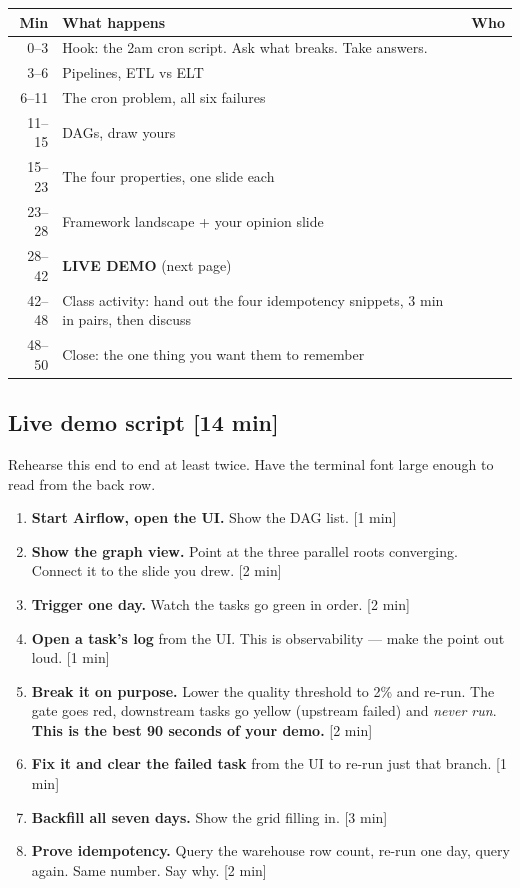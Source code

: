 \documentclass[11pt]{article}
\newcommand{\key}[1]{\textcolor{accent}{\textbf{#1}}}
\newcommand{\tm}[1]{\textcolor{grayish}{\small\textsf{[#1]}}}
\begin{document}
\begin{center}
\small
\begin{tabular}{@{}rp{}p{}@{}}
\toprule
\textbf{Min} & \textbf{What happens} & \textbf{Who} \\
\midrule
0--3   & Hook: the 2am cron script. Ask what breaks. Take answers. & \\
3--6   & Pipelines, ETL vs ELT & \\
6--11  & The cron problem, all six failures & \\
11--15 & DAGs, draw yours & \\
15--23 & The four properties, one slide each & \\
23--28 & Framework landscape + your opinion slide & \\
\midrule
28--42 & \textbf{LIVE DEMO} (next page) & \\
\midrule
42--48 & Class activity: hand out the four idempotency snippets, 3 min in pairs, then discuss & \\
48--50 & Close: the one thing you want them to remember & \\
\bottomrule
\end{tabular}
\end{center}

\subsection{Live demo script \tm{14 min}}

Rehearse this end to end at least twice. Have the terminal font large enough
to read from the back row.

\begin{enumerate}
  \item \textbf{Start Airflow, open the UI.} Show the DAG list. \tm{1 min}
  \item \textbf{Show the graph view.} Point at the three parallel roots
        converging. Connect it to the slide you drew. \tm{2 min}
  \item \textbf{Trigger one day.} Watch the tasks go green in order. \tm{2 min}
  \item \textbf{Open a task's log} from the UI. This is observability --- make
        the point out loud. \tm{1 min}
  \item \textbf{Break it on purpose.} Lower the quality threshold to 2\% and
        re-run. The gate goes red, downstream tasks go yellow (upstream
        failed) and \emph{never run}. \key{This is the best 90 seconds of your
        demo.} \tm{2 min}
  \item \textbf{Fix it and clear the failed task} from the UI to re-run just
        that branch. \tm{1 min}
  \item \textbf{Backfill all seven days.} Show the grid filling in. \tm{3 min}
  \item \textbf{Prove idempotency.} Query the warehouse row count, re-run one
        day, query again. Same number. Say why. \tm{2 min}
\end{enumerate}
\end{document}
